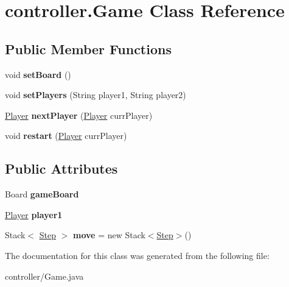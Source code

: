 \hypertarget{classcontroller_1_1Game}{\section{controller.\-Game Class Reference}
\label{classcontroller_1_1Game}
}
\subsection*{Public Member Functions}
\begin{DoxyCompactItemize}
\item 
\hypertarget{classcontroller_1_1Game_ab16ee51cf48633d3d072a964de234b2b}{void {\bfseries set\-Board} ()}\label{classcontroller_1_1Game_ab16ee51cf48633d3d072a964de234b2b}

\item 
\hypertarget{classcontroller_1_1Game_af83607dbad5e6502359af3d97b05da3b}{void {\bfseries set\-Players} (String player1, String player2)}\label{classcontroller_1_1Game_af83607dbad5e6502359af3d97b05da3b}

\item 
\hypertarget{classcontroller_1_1Game_a5bee55ed8349d171a0d2cbdf4aa767d4}{\hyperlink{classcontroller_1_1Player}{Player} {\bfseries next\-Player} (\hyperlink{classcontroller_1_1Player}{Player} curr\-Player)}\label{classcontroller_1_1Game_a5bee55ed8349d171a0d2cbdf4aa767d4}

\item 
\hypertarget{classcontroller_1_1Game_abb852409646b9ea9a1565eb875d7d3ca}{void {\bfseries restart} (\hyperlink{classcontroller_1_1Player}{Player} curr\-Player)}\label{classcontroller_1_1Game_abb852409646b9ea9a1565eb875d7d3ca}

\end{DoxyCompactItemize}
\subsection*{Public Attributes}
\begin{DoxyCompactItemize}
\item 
\hypertarget{classcontroller_1_1Game_ad5a94f775d7191c1b0f77cc905a5a643}{Board {\bfseries game\-Board}}\label{classcontroller_1_1Game_ad5a94f775d7191c1b0f77cc905a5a643}

\item 
\hypertarget{classcontroller_1_1Game_a8e286412b3a4268a729727d6ed906a58}{\hyperlink{classcontroller_1_1Player}{Player} {\bfseries player1}}\label{classcontroller_1_1Game_a8e286412b3a4268a729727d6ed906a58}

\item 
\hypertarget{classcontroller_1_1Game_a5b5a4b59882c8d5f921daa1cc2a53b5a}{Stack$<$ \hyperlink{classcontroller_1_1Step}{Step} $>$ {\bfseries move} = new Stack$<$\hyperlink{classcontroller_1_1Step}{Step}$>$()}\label{classcontroller_1_1Game_a5b5a4b59882c8d5f921daa1cc2a53b5a}

\end{DoxyCompactItemize}


The documentation for this class was generated from the following file\-:\begin{DoxyCompactItemize}
\item 
controller/Game.\-java\end{DoxyCompactItemize}
